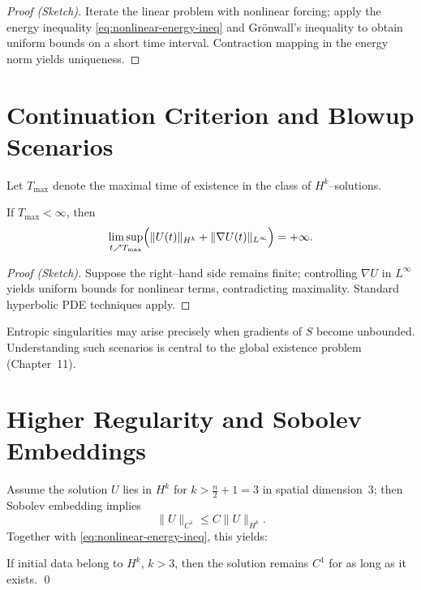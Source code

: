 \begin{proof}[Proof (Sketch)]
Iterate the linear problem with nonlinear forcing; apply the
energy inequality \eqref{eq:nonlinear-energy-ineq} and Gr\"onwall’s
inequality to obtain uniform bounds on a short time interval.  Contraction
mapping in the energy norm yields uniqueness.
\end{proof}



\section{Continuation Criterion and Blowup Scenarios}
\label{sec:continuation}

Let $T_{\max}$ denote the maximal time of existence in the class of
$H^{k}$--solutions.

\begin{theorem}
\label{thm:continuation}
If $T_{\max}<\infty$, then
\[
\limsup_{t\nearrow T_{\max}}
\Bigl(
\|U(t)\|_{H^{k}}
+\|\nabla U(t)\|_{L^{\infty}}
\Bigr)
=+\infty.
\]
\end{theorem}

\begin{proof}[Proof (Sketch)]
Suppose the right--hand side remains finite; controlling $\nabla U$ in
$L^{\infty}$ yields uniform bounds for nonlinear terms, contradicting
maximality.  Standard hyperbolic PDE techniques apply.
\end{proof}

\begin{remark}
Entropic singularities may arise precisely when gradients of $S$
become unbounded.  Understanding such scenarios is central to the global
existence problem (Chapter~11).
\end{remark}



\section{Higher Regularity and Sobolev Embeddings}
\label{sec:higher-regularity}

Assume the solution $U$ lies in $H^{k}$ for $k>\frac{n}{2}+1=3$ in
spatial dimension~$3$; then Sobolev embedding implies
\[
\|U\|_{C^{1}} \le C\|U\|_{H^{k}}.
\]
Together with \eqref{eq:nonlinear-energy-ineq}, this yields:
\begin{corollary}
\label{cor:higher-reg}
If initial data belong to $H^{k}$, $k>3$, then the solution remains
$C^{1}$ for as long as it exists. \qed
\end{corollary}



